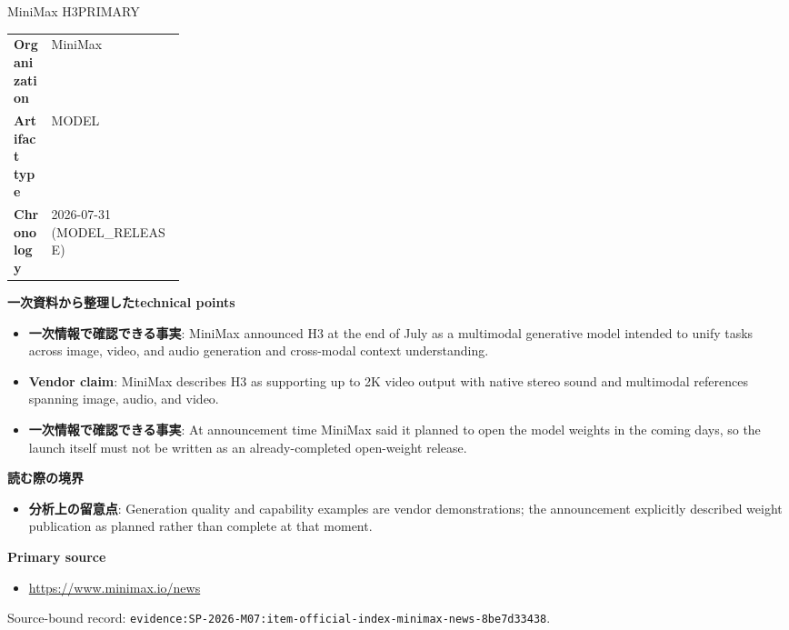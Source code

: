 \begin{technicalnote}{MiniMax H3}{PRIMARY}
\begin{tabularx}{\linewidth}{@{}>{\bfseries}p{0.22\linewidth}X@{}}
Organization & MiniMax \\
Artifact type & MODEL \\
Chronology & 2026-07-31 (MODEL\_RELEASE) \\
\end{tabularx}
\smallskip
{\bfseries 一次資料から整理したtechnical points}
\begin{itemize}[leftmargin=1.5em,itemsep=0.35em]
\item \textbf{一次情報で確認できる事実}: MiniMax announced H3 at the end of July as a multimodal generative model intended to unify tasks across image, video, and audio generation and cross-modal context understanding.
\item \textbf{Vendor claim}: MiniMax describes H3 as supporting up to 2K video output with native stereo sound and multimodal references spanning image, audio, and video.
\item \textbf{一次情報で確認できる事実}: At announcement time MiniMax said it planned to open the model weights in the coming days, so the launch itself must not be written as an already-completed open-weight release.
\end{itemize}
{\bfseries 読む際の境界}
\begin{itemize}[leftmargin=1.5em,itemsep=0.35em]
\item \textbf{分析上の留意点}: Generation quality and capability examples are vendor demonstrations; the announcement explicitly described weight publication as planned rather than complete at that moment.
\end{itemize}
{\bfseries Primary source}
\begingroup\sloppy
\begin{itemize}[leftmargin=1.5em,itemsep=0.25em]
\item {\scriptsize\url{https://www.minimax.io/news}}
\end{itemize}
\endgroup
{\scriptsize\color{SurveyMuted}Source-bound record: \texttt{evidence:SP-2026-M07:item-official-index-minimax-news-8be7d33438}.}
\end{technicalnote}
\medskip

